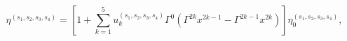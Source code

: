\begin{equation}
\eta^{(s_1,s_2,s_3,s_4)} 
= \left[ 1 + \sum_{k=1}^5 u_k^{(s_1,s_2,s_3,s_4)} 
\Gamma^0 \left( \Gamma^{2k} x^{2k-1} - \Gamma^{2k-1} x^{2k} \right) \right]
\eta_0^{(s_1,s_2,s_3,s_4)},
\end{equation}

